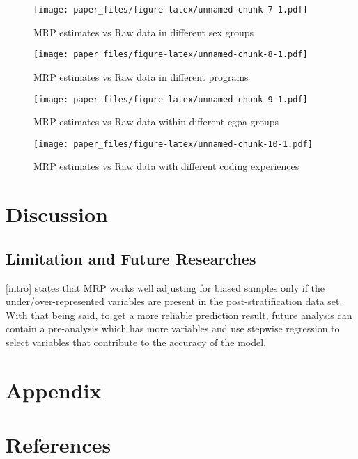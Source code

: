 \documentclass[
]{article}
\begin{document}
\begin{figure}
\centering
\texttt{[image: paper\_files/figure-latex/unnamed-chunk-7-1.pdf]}
\caption{MRP estimates vs Raw data in different sex groups}
\end{figure}

\begin{figure}
\centering
\texttt{[image: paper\_files/figure-latex/unnamed-chunk-8-1.pdf]}
\caption{MRP estimates vs Raw data in different programs}
\end{figure}

\begin{figure}
\centering
\texttt{[image: paper\_files/figure-latex/unnamed-chunk-9-1.pdf]}
\caption{MRP estimates vs Raw data within different cgpa groups}
\end{figure}

\begin{figure}
\centering
\texttt{[image: paper\_files/figure-latex/unnamed-chunk-10-1.pdf]}
\caption{MRP estimates vs Raw data with different coding experiences}
\end{figure}

\hypertarget{discussion}{%
\section{Discussion}\label{discussion}}

\hypertarget{limitation-and-future-researches}{%
\subsection{Limitation and Future
Researches}\label{limitation-and-future-researches}}

{[}intro{]} states that MRP works well adjusting for biased samples only
if the under/over-represented variables are present in the
post-stratification data set. With that being said, to get a more
reliable prediction result, future analysis can contain a pre-analysis
which has more variables and use stepwise regression to select variables
that contribute to the accuracy of the model.

\newpage

\hypertarget{appendix}{%
\section*{Appendix}\label{appendix}}

\newpage

\hypertarget{references}{%
\section{References}\label{references}}
\end{document}
